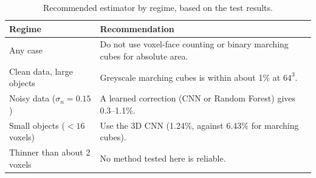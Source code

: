 \begin{table}[t]
  \centering\footnotesize
  \caption{Recommended estimator by regime, based on the test results.}
  \label{tab:regime}
  \begin{tabular}{p{2.3cm}p{5.6cm}}
    \toprule
    Regime & Recommendation \\
    \midrule
    Any case & Do not use voxel-face counting or binary marching cubes for absolute area. \\
    Clean data, large objects & Greyscale marching cubes is within about 1\% at $64^3$. \\
    Noisy data ($\sigma_n=0.15$) & A learned correction (CNN or Random Forest) gives 0.3--1.1\%. \\
    Small objects ($<16$ voxels) & Use the 3D CNN (1.24\%, against 6.43\% for marching cubes). \\
    Thinner than about 2 voxels & No method tested here is reliable. \\
    \bottomrule
  \end{tabular}
\end{table}
